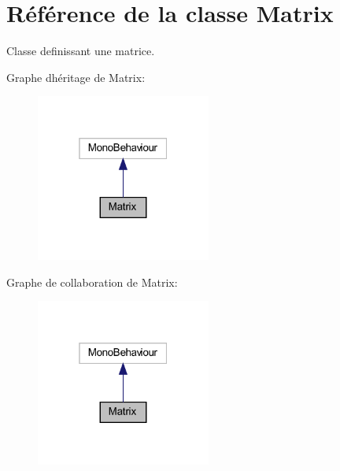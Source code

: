 \hypertarget{class_matrix}{}\section{Référence de la classe Matrix}
\label{class_matrix}


Classe definissant une matrice.  




Graphe d\textquotesingle{}héritage de Matrix\+:\nopagebreak
\begin{figure}[H]
\begin{center}
\leavevmode
\includegraphics[width=163pt]{class_matrix__inherit__graph}
\end{center}
\end{figure}


Graphe de collaboration de Matrix\+:\nopagebreak
\begin{figure}[H]
\begin{center}
\leavevmode
\includegraphics[width=163pt]{class_matrix__coll__graph}
\end{center}
\end{figure}
